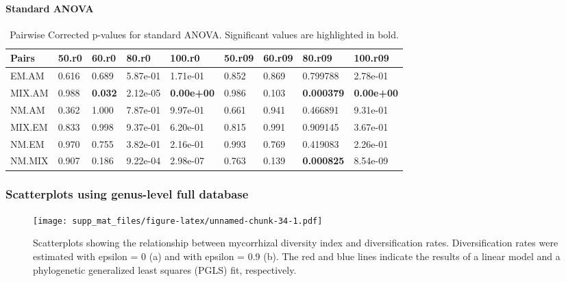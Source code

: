 \documentclass[]{article}
\let\oldparagraph\paragraph
\renewcommand{\paragraph}[1]{\oldparagraph{#1}\mbox{}}
\begin{document}
\hypertarget{standard-anova-7}{%
\paragraph{Standard ANOVA}\label{standard-anova-7}}

\begin{table}[H]

\caption{\label{tab:unnamed-chunk-33}Pairwise Corrected p-values for standard ANOVA. Significant values are highlighted in bold.}
\centering
\begin{tabular}{l|l|l|l|l|l|l|l|l}
\hline
Pairs & 50.r0 & 60.r0 & 80.r0 & 100.r0 & 50.r09 & 60.r09 & 80.r09 & 100.r09\\
\hline
EM.AM & 0.616 & 0.689 & 5.87e-01 & 1.71e-01 & 0.852 & 0.869 & 0.799788 & 2.78e-01\\
\hline
MIX.AM & 0.988 & \textbf{0.032} & 2.12e-05 & \textbf{0.00e+00} & 0.986 & 0.103 & \textbf{0.000379} & \textbf{0.00e+00}\\
\hline
NM.AM & 0.362 & 1.000 & 7.87e-01 & 9.97e-01 & 0.661 & 0.941 & 0.466891 & 9.31e-01\\
\hline
MIX.EM & 0.833 & 0.998 & 9.37e-01 & 6.20e-01 & 0.815 & 0.991 & 0.909145 & 3.67e-01\\
\hline
NM.EM & 0.970 & 0.755 & 3.82e-01 & 2.16e-01 & 0.993 & 0.769 & 0.419083 & 2.26e-01\\
\hline
NM.MIX & 0.907 & 0.186 & 9.22e-04 & 2.98e-07 & 0.763 & 0.139 & \textbf{0.000825} & 8.54e-09\\
\hline
\end{tabular}
\end{table}

\hypertarget{scatterplots-using-genus-level-full-database}{%
\subsubsection{Scatterplots using genus-level full
database}\label{scatterplots-using-genus-level-full-database}}

\begin{figure}
\centering
\texttt{[image: supp\_mat\_files/figure-latex/unnamed-chunk-34-1.pdf]}
\caption{Scatterplots showing the relationship between mycorrhizal
diversity index and diversification rates. Diversification rates were
estimated with epsilon = 0 (a) and with epsilon = 0.9 (b). The red and
blue lines indicate the results of a linear model and a phylogenetic
generalized least squares (PGLS) fit, respectively.}
\end{figure}
\end{document}
